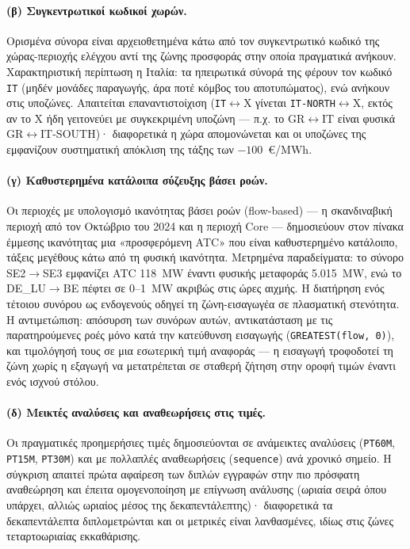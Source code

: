 \paragraph{(β) Συγκεντρωτικοί κωδικοί χωρών.}
Ορισμένα σύνορα είναι αρχειοθετημένα κάτω από τον συγκεντρωτικό κωδικό της χώρας-περιοχής ελέγχου αντί της ζώνης προσφοράς στην οποία πραγματικά ανήκουν. Χαρακτηριστική περίπτωση η Ιταλία: τα ηπειρωτικά σύνορά της φέρουν τον κωδικό \texttt{IT} (μηδέν μονάδες παραγωγής, άρα ποτέ κόμβος του αποτυπώματος), ενώ ανήκουν στις υποζώνες. Απαιτείται επαναντιστοίχιση (\texttt{IT}$\leftrightarrow$X γίνεται \texttt{IT-NORTH}$\leftrightarrow$X, εκτός αν το X ήδη γειτονεύει με συγκεκριμένη υποζώνη --- π.χ. το GR$\leftrightarrow$IT είναι φυσικά GR$\leftrightarrow$IT-SOUTH)· διαφορετικά η χώρα απομονώνεται και οι υποζώνες της εμφανίζουν συστηματική απόκλιση της τάξης των $-100$~€/MWh.

\paragraph{(γ) Καθυστερημένα κατάλοιπα σύζευξης βάσει ροών.}
Οι περιοχές με υπολογισμό ικανότητας βάσει ροών (flow-based) --- η σκανδιναβική περιοχή από τον Οκτώβριο του 2024 και η περιοχή Core --- δημοσιεύουν στον πίνακα έμμεσης ικανότητας μια «προσφερόμενη ATC» που είναι καθυστερημένο κατάλοιπο, τάξεις μεγέθους κάτω από τη φυσική ικανότητα. Μετρημένα παραδείγματα: το σύνορο SE2$\to$SE3 εμφανίζει ATC 118~MW έναντι φυσικής μεταφοράς 5.015~MW, ενώ το DE\_LU$\to$BE πέφτει σε 0--1~MW ακριβώς στις ώρες αιχμής. Η διατήρηση ενός τέτοιου συνόρου ως ενδογενούς οδηγεί τη ζώνη-εισαγωγέα σε πλασματική στενότητα. Η αντιμετώπιση: απόσυρση των συνόρων αυτών, αντικατάσταση με τις παρατηρούμενες ροές μόνο κατά την κατεύθυνση εισαγωγής (\texttt{GREATEST(flow, 0)}), και τιμολόγησή τους σε μια εσωτερική τιμή αναφοράς --- η εισαγωγή τροφοδοτεί τη ζώνη χωρίς η εξαγωγή να μετατρέπεται σε σταθερή ζήτηση στην οροφή τιμών έναντι ενός ισχνού στόλου.

\paragraph{(δ) Μεικτές αναλύσεις και αναθεωρήσεις στις τιμές.}
Οι πραγματικές προημερήσιες τιμές δημοσιεύονται σε ανάμεικτες αναλύσεις (\texttt{PT60M}, \texttt{PT15M}, \texttt{PT30M}) και με πολλαπλές αναθεωρήσεις (\texttt{sequence}) ανά χρονικό σημείο. Η σύγκριση απαιτεί πρώτα αφαίρεση των διπλών εγγραφών στην πιο πρόσφατη αναθεώρηση και έπειτα ομογενοποίηση με επίγνωση ανάλυσης (ωριαία σειρά όπου υπάρχει, αλλιώς ωριαίος μέσος της δεκαπεντάλεπτης)· διαφορετικά τα δεκαπεντάλεπτα διπλομετρώνται και οι μετρικές είναι λανθασμένες, ιδίως στις ζώνες τεταρτοωριαίας εκκαθάρισης.

